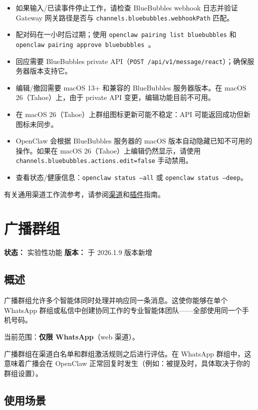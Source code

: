 \begin{itemize}
  \item 如果输入/已读事件停止工作，请检查 BlueBubbles webhook 日志并验证 Gateway 网关路径是否与 \texttt{channels.bluebubbles.webhookPath} 匹配。
  \item 配对码在一小时后过期；使用 \texttt{openclaw pairing list bluebubbles} 和 \texttt{openclaw pairing approve bluebubbles }。
  \item 回应需要 BlueBubbles private API（\texttt{POST /api/v1/message/react}）；确保服务器版本支持它。
  \item 编辑/撤回需要 macOS 13+ 和兼容的 BlueBubbles 服务器版本。在 macOS 26（Tahoe）上，由于 private API 变更，编辑功能目前不可用。
  \item 在 macOS 26（Tahoe）上群组图标更新可能不稳定：API 可能返回成功但新图标未同步。
  \item OpenClaw 会根据 BlueBubbles 服务器的 macOS 版本自动隐藏已知不可用的操作。如果在 macOS 26（Tahoe）上编辑仍然显示，请使用 \texttt{channels.bluebubbles.actions.edit=false} 手动禁用。
  \item 查看状态/健康信息：\texttt{openclaw status --all} 或 \texttt{openclaw status --deep}。
\end{itemize}


有关通用渠道工作流参考，请参阅\href{/channels}{渠道}和\href{/tools/plugin}{插件}指南。


\clearpage

\section{广播群组}


\textbf{状态：} 实验性功能
\textbf{版本：} 于 2026.1.9 版本新增

\subsection{概述}


广播群组允许多个智能体同时处理并响应同一条消息。这使你能够在单个 WhatsApp 群组或私信中创建协同工作的专业智能体团队——全部使用同一个手机号码。

当前范围：\textbf{仅限 WhatsApp}（web 渠道）。

广播群组在渠道白名单和群组激活规则之后进行评估。在 WhatsApp 群组中，这意味着广播会在 OpenClaw 正常回复时发生（例如：被提及时，具体取决于你的群组设置）。

\subsection{使用场景}


